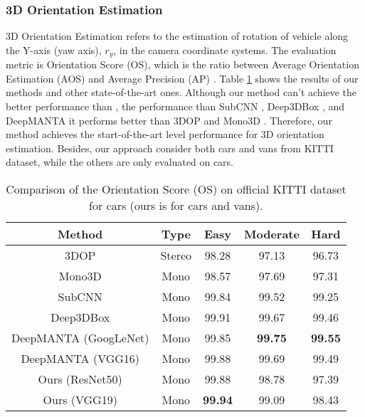 \subsubsection{3D Orientation Estimation}
3D Orientation Estimation refers to the estimation of rotation of vehicle along the Y-axis (yaw axis), $r_y$, in the camera coordinate systems. The evaluation metric is Orientation Score (OS), which is the ratio between Average Orientation Estimation (AOS) and Average Precision (AP) \cite{DBLP:journals/corr/MousavianAFK16}. Table \ref{os_cmp} shows the results of our methods and other state-of-the-art ones. Although our method can't achieve the better performance than , the performance than SubCNN \cite{DBLP:journals/corr/XiangCLS16},  Deep3DBox \cite{DBLP:journals/corr/MousavianAFK16}, and DeepMANTA \cite{DBLP:journals/corr/ChabotCRTC17} it performs better than 3DOP \cite{Chen:2015:OPA:2969239.2969287} and Mono3D \cite{cvpr16chen}.  Therefore, our method achieves the start-of-the-art level performance for 3D orientation estimation. Besides, our approach consider both cars and vans from KITTI dataset, while the others are only evaluated on cars.

\tbd [OS = AOS / AP]

\begin{table}[H]
	\centering
	\caption{Comparison of the Orientation Score (OS) on official KITTI dataset for cars (ours is for cars and vans).}
	\label{os_cmp}
\begin{tabular}{|c|c|c|c|c|}
	\hline
	Method                                                                        & Type   & Easy           & Moderate       & Hard           \\ \hline
	3DOP \cite{Chen:2015:OPA:2969239.2969287}                    & Stereo & 98.28          & 97.13          & 96.73          \\ \hline
	Mono3D \cite{cvpr16chen}                                     & Mono   & 98.57          & 97.69          & 97.31          \\ \hline
	SubCNN \cite{DBLP:journals/corr/XiangCLS16}                  & Mono   & 99.84          & 99.52          & 99.25          \\ \hline
	Deep3DBox \cite{DBLP:journals/corr/MousavianAFK16}           & Mono   & 99.91 & 99.67          & 99.46          \\ \hline
	DeepMANTA (GoogLeNet) \cite{DBLP:journals/corr/ChabotCRTC17} & Mono   & 99.85          & \textbf{99.75} & \textbf{99.55} \\ \hline
	DeepMANTA (VGG16) \cite{DBLP:journals/corr/ChabotCRTC17}     & Mono   & 99.88          & 99.69          & 99.49          \\ \hline
	Ours (ResNet50)                                                               & Mono   & 99.88          & 98.78          & 97.39          \\ \hline
	Ours (VGG19)																	& Mono	 & \textbf{99.94}	       & 99.09	      & 98.43         \\ \hline
	
\end{tabular}
\end{table}

